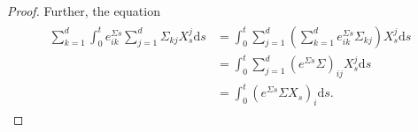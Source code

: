 \documentclass[11pt,titlepage]{article}
\theoremstyle{definition}
\theoremstyle{remark}
\begin{document}
\begin{proof}
		Further, the equation
		\begin{align}
			\begin{split}
				\sum_{k=1}^d \int_0^t e^{\Sigma s}_{ik} \sum_{j=1}^d \Sigma_{kj} X_s^j \mathrm{d}s &= \int_0^t \sum_{j=1}^d\left(\sum_{k=1}^d e^{\Sigma s}_{ik} \Sigma_{kj}\right)X_s^j\mathrm{d}s\\
				&=\int_0^t \sum_{j=1}^d (e^{\Sigma s}\Sigma)_{ij}X_s^j\mathrm{d}s\\
				&=\int_0^t (e^{\Sigma s}\Sigma X_s)_i \mathrm{d}s. \label{NR:ito1}

\end{split}
\end{align}
\end{proof}
\end{document}

